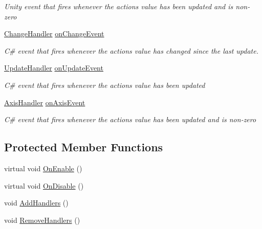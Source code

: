 \begin{DoxyCompactItemize}
\begin{DoxyCompactList}\small\item\em Unity event that fires whenever the action\textquotesingle{}s value has been updated and is non-\/zero \end{DoxyCompactList}\item 
\mbox{\hyperlink{class_valve_1_1_v_r_1_1_steam_v_r___behaviour___vector2_aae8467eb06531543c1ea5b6033b53495}{Change\+Handler}} \mbox{\hyperlink{class_valve_1_1_v_r_1_1_steam_v_r___behaviour___vector2_ae08a254e3b773ea02af1bca840ee25ed}{on\+Change\+Event}}
\begin{DoxyCompactList}\small\item\em C\# event that fires whenever the action\textquotesingle{}s value has changed since the last update. \end{DoxyCompactList}\item 
\mbox{\hyperlink{class_valve_1_1_v_r_1_1_steam_v_r___behaviour___vector2_a234f522c6df42a17b1f11cf8e9556ada}{Update\+Handler}} \mbox{\hyperlink{class_valve_1_1_v_r_1_1_steam_v_r___behaviour___vector2_a4220120b88dec77f4c0a76fa934bcdc5}{on\+Update\+Event}}
\begin{DoxyCompactList}\small\item\em C\# event that fires whenever the action\textquotesingle{}s value has been updated \end{DoxyCompactList}\item 
\mbox{\hyperlink{class_valve_1_1_v_r_1_1_steam_v_r___behaviour___vector2_a8d32523a44d5d8f20a99caf00f35020d}{Axis\+Handler}} \mbox{\hyperlink{class_valve_1_1_v_r_1_1_steam_v_r___behaviour___vector2_a9733a0718e19f764f7faec02c5aac604}{on\+Axis\+Event}}
\begin{DoxyCompactList}\small\item\em C\# event that fires whenever the action\textquotesingle{}s value has been updated and is non-\/zero \end{DoxyCompactList}\end{DoxyCompactItemize}
\subsection*{Protected Member Functions}
\begin{DoxyCompactItemize}
\item 
virtual void \mbox{\hyperlink{class_valve_1_1_v_r_1_1_steam_v_r___behaviour___vector2_abb6ea64aedee97e38b1bb854fbab9223}{On\+Enable}} ()
\item 
virtual void \mbox{\hyperlink{class_valve_1_1_v_r_1_1_steam_v_r___behaviour___vector2_ab0cff6e0797561b567e3975d66760509}{On\+Disable}} ()
\item 
void \mbox{\hyperlink{class_valve_1_1_v_r_1_1_steam_v_r___behaviour___vector2_a44510489e8fb9f27372d569ee6a2693a}{Add\+Handlers}} ()
\item 
void \mbox{\hyperlink{class_valve_1_1_v_r_1_1_steam_v_r___behaviour___vector2_a97749202d22a3ed1f38c0a88eef2a783}{Remove\+Handlers}} ()
\end{DoxyCompactItemize}
